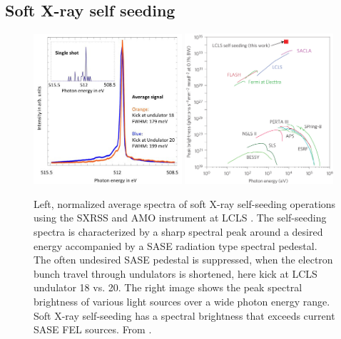 \subsection{Soft X-ray self seeding}
\begin{figure}
	\centering
		\includegraphics[width=0.49\textwidth]{images/Soft-X-ray-self-seeding.jpg}
		\includegraphics[width=0.49\textwidth]{images/spectral-brightness-fletcher-2015.jpg}
	\caption[Soft X-ray self-seeding spectra and brilliance of various lightsources.]{Left, normalized average spectra of soft X-ray self-seeding operations using the SXRSS and AMO instrument at LCLS \cite{Bucher-2014-Unpublished}. The self-seeding spectra is characterized by a sharp spectral peak around a desired energy accompanied by a SASE radiation type spectral pedestal. The often undesired SASE pedestal is suppressed, when the electron bunch travel through undulators is shortened, here kick at LCLS undulator 18 vs. 20. The right image shows the peak spectral brightness of various light sources over a wide photon energy range. Soft X-ray self-seeding has a spectral brightness that exceeds current SASE FEL sources. From \citep{Fletcher-2015-NatPho}.}
	\label{fig:soft-xray-self-seeding}
\end{figure}
